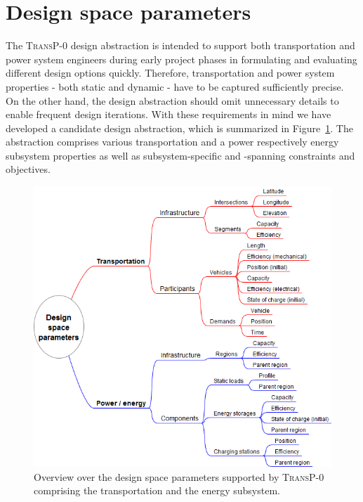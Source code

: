 \section{Design space parameters}
\label{proposed_model}

The \textsc{TransP-0} design abstraction is intended to support both transportation and power system engineers during early project phases in formulating and evaluating different design options quickly. Therefore, transportation and power system properties - both static and dynamic - have to be captured sufficiently precise. On the other hand, the design abstraction should omit unnecessary details to enable frequent design iterations. With these requirements in mind we have developed a candidate design abstraction, which is summarized in Figure~\ref{system_design}. The abstraction comprises various transportation and a power respectively energy subsystem properties as well as subsystem-specific and -spanning constraints and objectives.

\begin{figure}[h!]
	\includegraphics[width=\columnwidth]{./gfx/system_design.png}
	\caption{Overview over the design space parameters supported by \textsc{TransP-0} comprising the transportation and the energy subsystem.}
	\label{system_design}
\end{figure}

